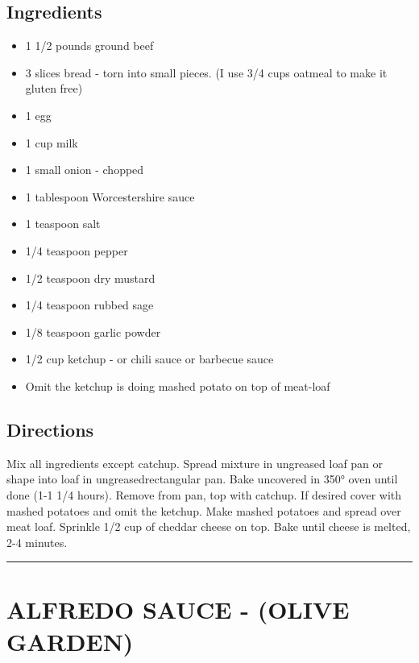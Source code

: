 \documentclass[
]{book}
\providecommand{\tightlist}{%
  \setlength{\itemsep}{0pt}\setlength{\parskip}{0pt}}
\begin{document}
\hypertarget{ingredients-61}{%
\subsection*{Ingredients}\label{ingredients-61}}


\begin{itemize}
\tightlist
\item
  1 1/2 pounds ground beef
\item
  3 slices bread - torn into small pieces. (I use 3/4 cups oatmeal to make it gluten free)
\item
  1 egg
\item
  1 cup milk
\item
  1 small onion - chopped
\item
  1 tablespoon Worcestershire sauce
\item
  1 teaspoon salt
\item
  1/4 teaspoon pepper
\item
  1/2 teaspoon dry mustard
\item
  1/4 teaspoon rubbed sage
\item
  1/8 teaspoon garlic powder
\item
  1/2 cup ketchup - or chili sauce or barbecue sauce
\item
  Omit the ketchup is doing mashed potato on top of meat-loaf
\end{itemize}

\hypertarget{directions-61}{%
\subsection*{Directions}\label{directions-61}}


Mix all ingredients except catchup. Spread mixture in ungreased loaf pan or shape into loaf in ungreasedrectangular pan. Bake uncovered in 350° oven until done (1-1 1/4 hours). Remove from pan, top with catchup. If desired cover with mashed potatoes and omit the ketchup. Make mashed potatoes and spread over meat loaf. Sprinkle 1/2 cup of cheddar cheese on top. Bake until cheese is melted, 2-4 minutes.

\begin{center}\rule{0.5\linewidth}{0.5pt}\end{center}

\hypertarget{alfredo-sauce---olive-garden}{%
\section*{ALFREDO SAUCE - (OLIVE GARDEN)}\label{alfredo-sauce---olive-garden}}
\end{document}
